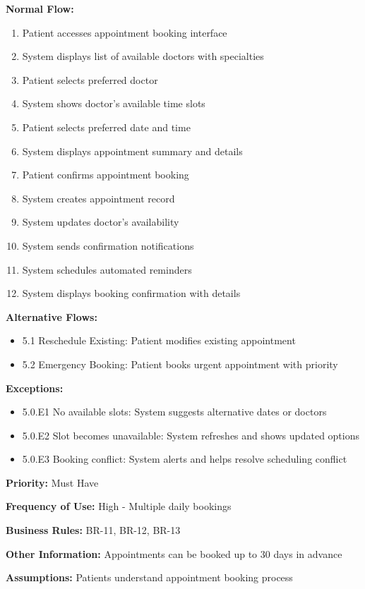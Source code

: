 \documentclass[12pt,a4paper]{article}
\begin{document}
\textbf{Normal Flow:}
\begin{enumerate}
\item Patient accesses appointment booking interface
\item System displays list of available doctors with specialties
\item Patient selects preferred doctor
\item System shows doctor's available time slots
\item Patient selects preferred date and time
\item System displays appointment summary and details
\item Patient confirms appointment booking
\item System creates appointment record
\item System updates doctor's availability
\item System sends confirmation notifications
\item System schedules automated reminders
\item System displays booking confirmation with details
\end{enumerate}

\textbf{Alternative Flows:}
\begin{itemize}
\item 5.1 Reschedule Existing: Patient modifies existing appointment
\item 5.2 Emergency Booking: Patient books urgent appointment with priority
\end{itemize}

\textbf{Exceptions:}
\begin{itemize}
\item 5.0.E1 No available slots: System suggests alternative dates or doctors
\item 5.0.E2 Slot becomes unavailable: System refreshes and shows updated options
\item 5.0.E3 Booking conflict: System alerts and helps resolve scheduling conflict
\end{itemize}

\textbf{Priority:} Must Have

\textbf{Frequency of Use:} High - Multiple daily bookings

\textbf{Business Rules:} BR-11, BR-12, BR-13

\textbf{Other Information:} Appointments can be booked up to 30 days in advance

\textbf{Assumptions:} Patients understand appointment booking process
\end{document}

